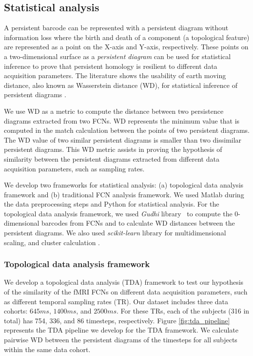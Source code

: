 \subsection{Statistical analysis}
\label{sec:si}

A persistent barcode can be represented with a persistent diagram without information loss where the birth and death of a component (a topological feature) are represented as a point on the X-axis and Y-axis, respectively. These points on a two-dimensional surface as a \emph{persistent diagram} can be used for statistical inference to prove that persistent homology is resilient to different data acquisition parameters. The literature shows the usability of earth moving distance, also known as Wasserstein distance (WD), for statistical inference of persistent diagrams \cite{vallender1974calculation, edelsbrunner2013persistent}.

We use WD as a metric to compute the distance between two persistence diagrams extracted from two FCNs. WD represents the minimum value that is computed in the match calculation between the points of two persistent diagrams. The WD value of two similar persistent diagrams is smaller than two dissimilar persistent diagrams. This WD metric assists in proving the hypothesis of similarity between the persistent diagrams extracted from different data acquisition parameters, such as sampling rates. 

We develop two frameworks for statistical analysis: (a) topological data analysis framework and (b) traditional FCN analysis framework. We used Matlab during the data preprocessing steps and Python for statistical analysis. For the topological data analysis framework, we used \emph{Gudhi} library~\cite{jea_hera} to compute the 0-dimensional barcodes from FCNs and to calculate WD distances between the persistent diagrams. We also used \emph{scikit-learn} library for multidimensional scaling, and cluster calculation \cite{scikit-learn}.

\subsubsection{Topological data analysis framework}
\label{sec:tda_pipeline}




We develop a topological data analysis (TDA) framework to test our hypothesis of the similarity of the fMRI FCNs on different data acquisition parameters, such as different temporal sampling rates (TR). Our dataset includes three data cohorts: $645ms$, $1400ms$, and $2500ms$. For these TRs, each of the subjects (316 in total) has 754, 336, and 86 timesteps, respectively. Figure \ref{fig:tda_pipeline} represents the TDA pipeline we develop for the TDA framework. We calculate pairwise WD between the persistent diagrams of the timesteps for all subjects within the same data cohort. 

